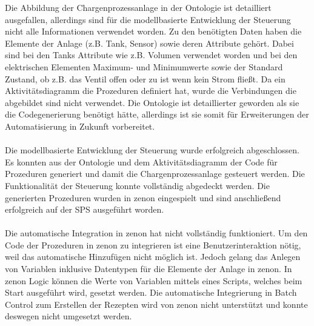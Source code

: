 Die Abbildung der Chargenprozessanlage in der Ontologie ist detailliert ausgefallen, allerdings sind für die modellbasierte Entwicklung der Steuerung nicht alle Informationen verwendet worden. Zu den benötigten Daten haben die Elemente der Anlage (z.B. Tank, Sensor) sowie deren Attribute gehört. Dabei sind bei den Tanks Attribute wie z.B. Volumen verwendet worden und bei den elektrischen Elementen Maximum- und Minimumwerte sowie der Standard Zustand, ob z.B. das Ventil offen oder zu ist wenn kein Strom fließt. Da ein Aktivitätsdiagramm die Prozeduren definiert hat, wurde die Verbindungen die abgebildet sind nicht verwendet.
Die Ontologie ist detaillierter geworden als sie die Codegenerierung benötigt hätte, allerdings ist sie somit für Erweiterungen der Automatisierung in Zukunft vorbereitet. 
\\\\
Die modellbasierte Entwicklung der Steuerung wurde erfolgreich abgeschlossen. Es konnten aus der Ontologie und dem Aktivitätsdiagramm der Code für Prozeduren generiert und damit die Chargenprozessanlage gesteuert werden. 
Die Funktionalität der Steuerung konnte vollständig abgedeckt werden. Die generierten Prozeduren wurden in zenon eingespielt und sind anschließend erfolgreich auf der SPS ausgeführt worden.
\\\\
Die automatische Integration in zenon hat nicht vollständig funktioniert. 
Um den Code der Prozeduren in zenon zu integrieren ist eine Benutzerinteraktion nötig, weil das automatische Hinzufügen nicht möglich ist. Jedoch gelang das Anlegen von Variablen inklusive Datentypen für die Elemente der Anlage in zenon. In zenon Logic können die Werte von Variablen mittels eines Scripts, welches beim Start ausgeführt wird, gesetzt werden. 
Die automatische Integrierung in Batch Control zum Erstellen der Rezepten wird von zenon nicht unterstützt und konnte deswegen nicht umgesetzt werden. 

















